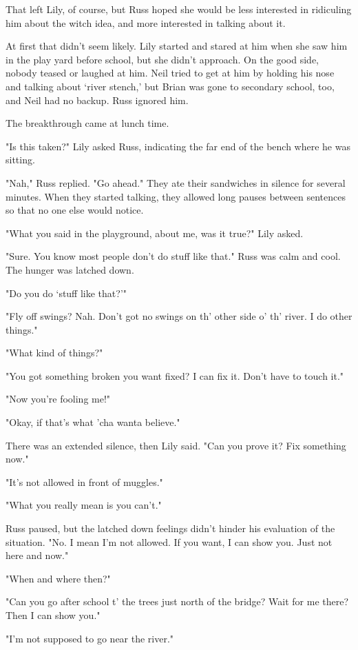 That left Lily, of course, but Russ hoped she would be less interested in ridiculing him about the witch idea, and more interested in talking about it.

At first that didn't seem likely. Lily started and stared at him when she saw him in the play yard before school, but she didn't approach. On the good side, nobody teased or laughed at him. Neil tried to get at him by holding his nose and talking about `river stench,' but Brian was gone to secondary school, too, and Neil had no backup. Russ ignored him.

The breakthrough came at lunch time.

"Is this taken?" Lily asked Russ, indicating the far end of the bench where he was sitting.

"Nah," Russ replied. "Go ahead." They ate their sandwiches in silence for several minutes. When they started talking, they allowed long pauses between sentences so that no one else would notice.

"What you said in the playground, about me, was it true?" Lily asked.

"Sure. You know most people don't do stuff like that." Russ was calm and cool. The hunger was latched down.

"Do you do `stuff like that?'"

"Fly off swings? Nah. Don't got no swings on th' other side o' th' river. I do other things."

"What kind of things?"

"You got something broken you want fixed? I can fix it. Don't have to touch it."

"Now you're fooling me!"

"Okay, if that's what 'cha wanta believe."

There was an extended silence, then Lily said. "Can you prove it? Fix something now."

"It's not allowed in front of muggles."

"What you really mean is you can't."

Russ paused, but the latched down feelings didn't hinder his evaluation of the situation. "No. I mean I'm not allowed. If you want, I can show you. Just not here and now."

"When and where then?"

"Can you go after school t' the trees just north of the bridge? Wait for me there? Then I can show you."

"I'm not supposed to go near the river."

